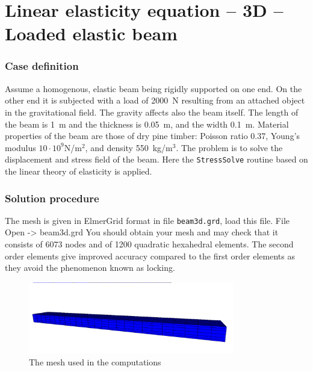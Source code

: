 \chapter{Linear elasticity equation -- 3D -- Loaded elastic beam}



\subsection*{Case definition}

Assume a homogenous, elastic beam being rigidly supported on one 
end. On the other end it is subjected with a load of 2000~N
resulting from an attached object in the gravitational field. The gravity affects also the beam itself.
The length of the beam is 1~m and the thickness is 0.05~m, and the width 
0.1~m.
Material properties of the beam are those of dry pine timber:
Poisson 
ratio 0.37, Young's modulus $10\cdot 10^9$N/m$^2$, and density 550~kg/m$^3$. 
The problem is to solve the displacement and stress field of the beam.  
Here the \texttt{StressSolve} routine based on the 
linear theory of elasticity is applied.


\subsection*{Solution procedure}

The mesh is given in ElmerGrid format in file \texttt{beam3d.grd}, load this file.
\ttbegin
File 
  Open -> beam3d.grd
\ttend
You should obtain your mesh and may check that it consists of 6073 nodes and of 
1200 quadratic hexahedral elements. The second order elements give
improved accuracy compared to the first order elements as they avoid the phenomenon known as locking.
\begin{figure}[h!]
\begin{center}
  \includegraphics[width=0.8\textwidth,viewport=0 0 1230 300,clip]{beam_mesh}
  \caption{The mesh used in the computations}
  \label{fig:elast_mesh}
\end{center}
\end{figure}

